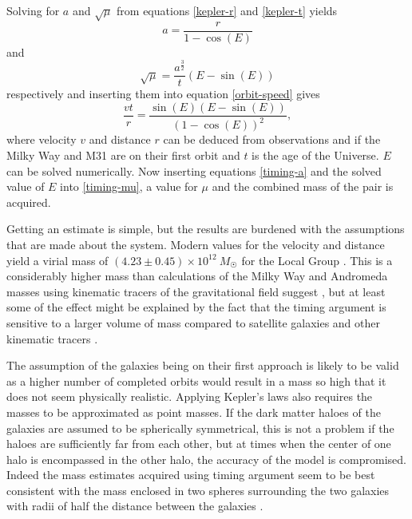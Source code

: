 \documentclass[english, oneside]{HYgradu}
\begin{document}
Solving for $a$ and $\sqrt{\mu}$ from equations \ref{kepler-r} and \ref{kepler-t} yields
\begin{equation}\label{timing-a}
a = \frac{r}{1-\cos(E)}
\end{equation}
and
\begin{equation}\label{timing-mu}
\sqrt{\mu} = \frac{a^\frac{3}{2}}{t}(E - \sin(E))
\end{equation}
respectively and inserting them into equation \ref{orbit-speed} gives
\begin{equation}
\frac{vt}{r} = \frac{\sin (E) \left(E - \sin(E)\right)}{(1- \cos(E))^2},
\end{equation}
where velocity $v$ and distance $r$ can be deduced from observations and if the Milky Way and M31 are on their first orbit and $t$ is the age of the Universe. $E$ can be solved numerically. Now inserting equations \ref{timing-a} and the solved value of $E$ into \ref{timing-mu}, a value for $\mu$ and the combined mass of the pair is acquired.

Getting an estimate is simple, but the results are burdened with the assumptions that are made about the system. Modern values for the velocity and distance yield a virial mass of $(4.23 \pm 0.45) \times 10^{12}~M_{\astrosun}$ for the Local Group \citep{vandermarel2012m31}. This is a considerably higher mass than calculations of the Milky Way and Andromeda masses using kinematic tracers of the gravitational field suggest \citep{wang2015estimating}, but at least some of the effect might be explained by the fact that the timing argument is sensitive to a larger volume of mass compared to satellite galaxies and other kinematic tracers \citep{kroeker1991accuracy}.

The assumption of the galaxies being on their first approach is likely to be valid as a higher number of completed orbits would result in a mass so high that it does not seem physically realistic. Applying Kepler's laws also requires the masses to be approximated as point masses.  If the dark matter haloes of the galaxies are assumed to be spherically symmetrical, this is not a problem if the haloes are sufficiently far from each other, but at times when the center of one halo is encompassed in the other halo, the accuracy of the model is compromised. Indeed the mass estimates acquired using timing argument seem to be best consistent with the mass enclosed in two spheres surrounding the two galaxies with radii of half the distance between the galaxies \citep{kroeker1991accuracy}. 
\end{document}
